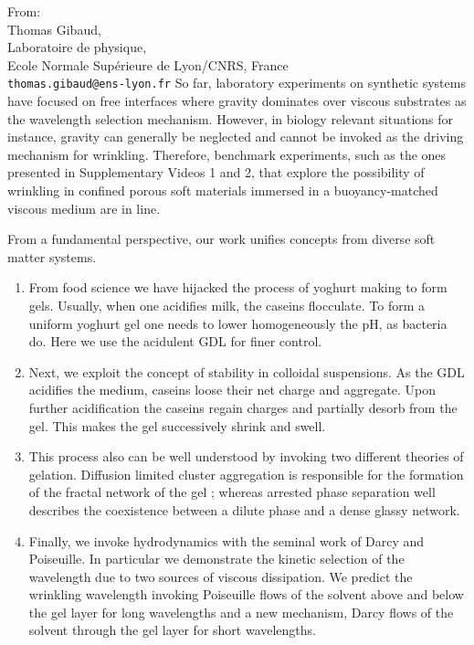 \documentclass[a4paper, parskip=true, firsthead=false, fromemail=true, foldmarks=false]{scrlttr2}
\begin{document}
\begin{letter}{From:\\
Thomas Gibaud,\\
Laboratoire de physique,\\
Ecole Normale Supérieure de Lyon/CNRS, France\\
\texttt{thomas.gibaud@ens-lyon.fr}
}
So far, laboratory experiments on synthetic systems have focused on free interfaces where gravity dominates over viscous substrates as the wavelength selection mechanism. However, in biology relevant situations for instance, gravity can generally be neglected and cannot be invoked as the driving mechanism for wrinkling. Therefore, benchmark experiments, such as the ones presented in Supplementary Videos 1 and 2, that explore the possibility of wrinkling in confined porous soft materials immersed in a buoyancy-matched viscous medium are in line.

From a fundamental perspective, our work unifies concepts from diverse soft matter systems.
\begin{enumerate}
\item From food science we have hijacked the process of yoghurt making to form gels. Usually, when one acidifies milk, the caseins flocculate. To form a uniform yoghurt gel one needs to lower homogeneously the pH, as bacteria do. Here we use the acidulent GDL for finer control.

\item  Next, we exploit the concept of stability in colloidal suspensions. As the GDL acidifies the medium, caseins loose their net charge and aggregate. Upon further acidification the caseins regain charges and partially desorb from the gel. This makes the gel successively shrink and swell.

\item This process also can be well understood by invoking two different theories of gelation. Diffusion limited cluster aggregation is responsible for the formation of the fractal network of the gel ; whereas arrested phase separation well describes the coexistence between a dilute phase and a dense glassy network.

\item Finally, we invoke hydrodynamics with the seminal work of Darcy and Poiseuille. In particular we demonstrate the kinetic selection of the wavelength due to two sources of viscous dissipation. We predict the wrinkling wavelength invoking Poiseuille flows of the solvent above and below the gel layer for long wavelengths and a new mechanism, Darcy flows of the solvent through the gel layer for short wavelengths.
\end{enumerate}




\end{letter}
\end{document}
